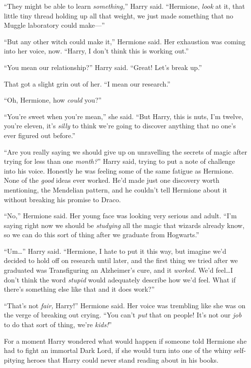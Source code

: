 “They might be able to learn \emph{something,}” Harry said. “Hermione, \emph{look} at it, that little tiny thread holding up all that weight, we just made something that no Muggle laboratory could make—”

“But any other witch could make it,” Hermione said. Her exhaustion was coming into her voice, now. “Harry, I don’t think this is working out.”

“You mean our relationship?” Harry said. “Great! Let’s break up.”

That got a slight grin out of her. “I mean our research.”

“Oh, Hermione, how \emph{could} you?”

“You’re sweet when you’re mean,” she said. “But Harry, this is nuts, I’m twelve, you’re eleven, it’s \emph{silly} to think we’re going to discover anything that no one’s ever figured out before.”

“Are you really saying we should give up on unravelling the secrets of magic after trying for less than one \emph{month?}” Harry said, trying to put a note of challenge into his voice. Honestly he was feeling some of the same fatigue as Hermione. None of the \emph{good} ideas ever worked. He’d made just one discovery worth mentioning, the Mendelian pattern, and he couldn’t tell Hermione about it without breaking his promise to Draco.

“No,” Hermione said. Her young face was looking very serious and adult. “I’m saying right now we should be \emph{studying} all the magic that wizards already know, so we can do this sort of thing after we graduate from Hogwarts.”

“Um…” Harry said. “Hermione, I hate to put it this way, but imagine we’d decided to hold off on research until later, and the first thing we tried after we graduated was Transfiguring an Alzheimer’s cure, and it \emph{worked.} We’d feel…I don’t think the word \emph{stupid} would adequately describe how we’d feel. What if there’s something else like that and it does work?”

“That’s not \emph{fair,} Harry!” Hermione said. Her voice was trembling like she was on the verge of breaking out crying. “You can’t \emph{put} that on people! It’s not our \emph{job} to do that sort of thing, we’re \emph{kids!}”

For a moment Harry wondered what would happen if someone told Hermione she had to fight an immortal Dark Lord, if she would turn into one of the whiny self-pitying heroes that Harry could never stand reading about in his books.

